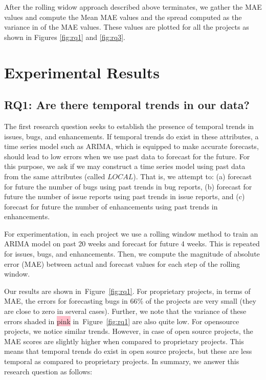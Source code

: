\documentclass[sigconf, preprint]{acmart}
\newcommand{\fig}[1]{Figure~\ref{fig:#1}}
\begin{document}
After the rolling widow approach described above terminates, we gather the MAE 
values and compute the Mean MAE values and the spread 
computed as the variance in of the MAE values. These values are 
plotted for all the projects as shown in Figures \ref{fig:rq1} and \ref{fig:rq3}.


\section{Experimental Results}
\label{sect:results}
\subsection*{\normalsize{RQ1: Are there temporal trends in our data?}}
				
				
		The first research question seeks to establish the presence of temporal 
		trends in issues, bugs, and enhancements. If temporal trends do exist in 
		these attributes, a time series model such as ARIMA, which is equipped to 
		make accurate forecasts, should lead to low errors when we use past data to 
		forecast for the future. For this purpose, we ask if we may construct a 
		time series model using past data from the same attributes (called $\mathit{LOCAL}$). That is, we attempt 
		to: (a) forecast for future the number of bugs using past trends in bug 
		reports, (b) forecast for future the number of issue reports using past 
		trends in issue reports, and (c) forecast for future the number of 
		enhancements using past trends in enhancements.
			
		For experimentation, in each project we use a rolling window 
		method to train an ARIMA model on past 20 weeks and forecast for future 4 
		weeks. This is repeated for issues, bugs, and enhancements. Then, we 
		compute the magnitude of absolute error (MAE) between actual and forecast 
		values for each step of the rolling window.
		
		Our results are shown in~\fig{rq1}. For proprietary projects, in terms of 
		MAE, the errors for forecasting bugs in 66\% of the 
		projects are very small (they are close to zero in several cases). Further, we note that 
		the variance of these errors shaded in \colorbox{pink}{pink} in~\fig{rq1}
		are also quite low. For opensource projects, we notice similar trends. However, in case of open source projects, the MAE 
		scores are slightly higher when compared to proprietary projects. This means 
		that temporal trends do exist in open source projects, but these are less 
		temporal as compared to proprietary projects. In summary, we answer this 
		research question as follows:\\[-0.1cm]
		
\end{document}
